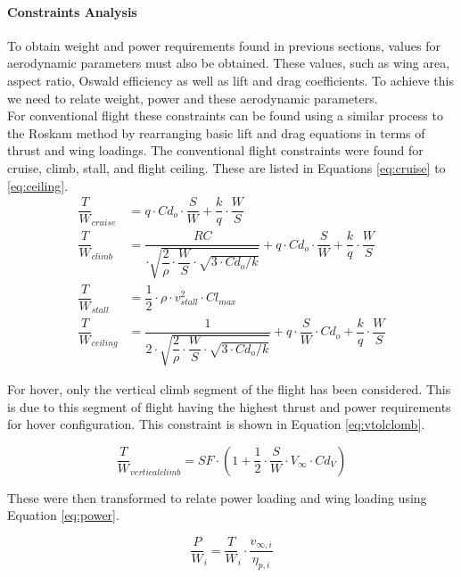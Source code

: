 \paragraph{Constraints Analysis}
To obtain weight and power requirements found in previous sections, values for aerodynamic parameters must also be obtained. These values, such as wing area, aspect ratio, Oswald efficiency as well as lift and drag coefficients. To achieve this we need to relate weight, power and these aerodynamic parameters.\\


For conventional flight these constraints can be found using a similar process to the Roskam method \cite{roskam1985airplane} by rearranging basic lift and drag equations in terms of thrust and wing loadings. The conventional flight constraints were found for cruise, climb, stall, and flight ceiling. These are listed in Equations \ref{eq:cruise} to \ref{eq:ceiling}.
\begin{align}
    \dfrac{T}{W}_{cruise} &= q \cdot Cd_o\cdot \dfrac{S}{W}+\dfrac{k}{q}\cdot \dfrac{W}{S} \label{eq:cruise}\\
    \dfrac{T}{W}_{climb} &=  \dfrac{RC}{\cdot \sqrt{\dfrac{2}{\rho}\cdot \dfrac{W}{S}\cdot \sqrt{3\cdot Cd_o/k}}} + q \cdot Cd_o\cdot \dfrac{S}{W}+\dfrac{k}{q}\cdot \dfrac{W}{S} \label{eq:climb}\\
    \dfrac{T}{W}_{stall} &= \dfrac{1}{2}\cdot \rho \cdot v_{stall}^2 \cdot Cl_{max} \label{eq:stall}\\
    \dfrac{T}{W}_{ceiling} &= \dfrac{1}{2\cdot \sqrt{\dfrac{2}{\rho}\cdot \dfrac{W}{S}\cdot \sqrt{3\cdot Cd_o/k}}} + q \cdot \dfrac{S}{W}\cdot Cd_o + \dfrac{k}{q}\cdot \dfrac{W}{S} \label{eq:ceiling}
\end{align}

For hover, only the vertical climb segment of the flight has been considered. This is due to this segment of flight having the highest thrust and power requirements for hover configuration. This constraint is shown in Equation \ref{eq:vtolclomb}.

\begin{equation}
        \dfrac{T}{W}_{vertical climb} = SF\cdot \left(
        1 + \dfrac{1}{2}\cdot \dfrac{S}{W}\cdot V_{\infty}\cdot Cd_{V}
        \right)
    \label{eq:vtolclomb}
\end{equation}

These were then transformed to relate power loading and wing loading using Equation \ref{eq:power}. 

\begin{equation}
        \dfrac{P}{W}_{i} = \dfrac{T}{W}_{i} \cdot \dfrac{v_{\infty, i}}{\eta_{p, i}}
    \label{eq:power}
\end{equation}

